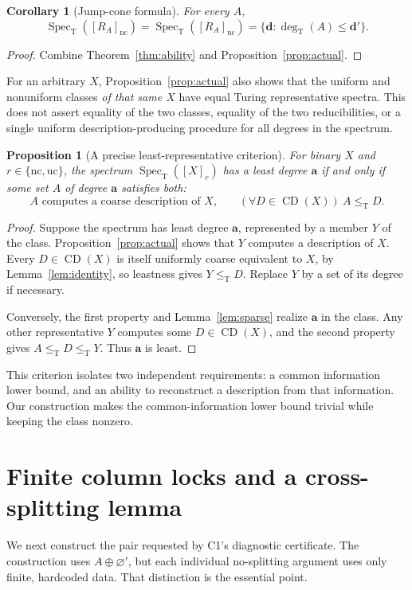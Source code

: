 \documentclass[11pt,a4paper]{article}
\newcommand{\leT}{\leq_{\mathrm T}}
\newcommand{\degT}{\operatorname{deg}_{\mathrm T}}
\newcommand{\Spec}{\operatorname{Spec}_{\mathrm T}}
\newcommand{\CD}{\operatorname{CD}}
\newcommand{\nc}{\mathrm{nc}}
\newcommand{\uc}{\mathrm{uc}}
\newcommand{\ddeg}{\mathbf d}
\newtheorem{proposition}[theorem]{Proposition}
\newtheorem{corollary}[theorem]{Corollary}
\theoremstyle{definition}\newtheorem{definition}[theorem]{Definition}
\theoremstyle{remark}\newtheorem{remark}[theorem]{Remark}
\begin{document}
\begin{corollary}[Jump-cone formula]\label{cor:spectrum}
For every $A$,
\[
 \Spec([R_A]_\nc)=\Spec([R_A]_\uc)
 =\{\ddeg:\degT(A)\leq\ddeg'\}.
\]
\end{corollary}
\begin{proof}
Combine Theorem~\ref{thm:ability} and Proposition~\ref{prop:actual}.
\end{proof}

For an arbitrary $X$, Proposition~\ref{prop:actual} also shows that the uniform and nonuniform classes \emph{of that same $X$} have equal Turing representative spectra. This does not assert equality of the two classes, equality of the two reducibilities, or a single uniform description-producing procedure for all degrees in the spectrum.

\begin{proposition}[A precise least-representative criterion]\label{prop:criterion}
For binary $X$ and $r\in\{\nc,\uc\}$, the spectrum $\Spec([X]_r)$ has a least degree $\mathbf a$ if and only if some set $A$ of degree $\mathbf a$ satisfies both:
\[
 \text{$A$ computes a coarse description of $X$,}
 \qquad
 (\forall D\in\CD(X))\ A\leT D.
\]
\end{proposition}
\begin{proof}
Suppose the spectrum has least degree $\mathbf a$, represented by a member $Y$ of the class. Proposition~\ref{prop:actual} shows that $Y$ computes a description of $X$. Every $D\in\CD(X)$ is itself uniformly coarse equivalent to $X$, by Lemma~\ref{lem:identity}, so leastness gives $Y\leT D$. Replace $Y$ by a set of its degree if necessary.

Conversely, the first property and Lemma~\ref{lem:sparse} realize $\mathbf a$ in the class. Any other representative $Y$ computes some $D\in\CD(X)$, and the second property gives $A\leT D\leT Y$. Thus $\mathbf a$ is least.
\end{proof}

This criterion isolates two independent requirements: a common information lower bound, and an ability to reconstruct a description from that information. Our construction makes the common-information lower bound trivial while keeping the class nonzero.

\section{Finite column locks and a cross-splitting lemma}
\label{sec:locks}
We next construct the pair requested by C1's diagnostic certificate. The construction uses $A\oplus\varnothing'$, but each individual no-splitting argument uses only finite, hardcoded data. That distinction is the essential point.
\end{document}
